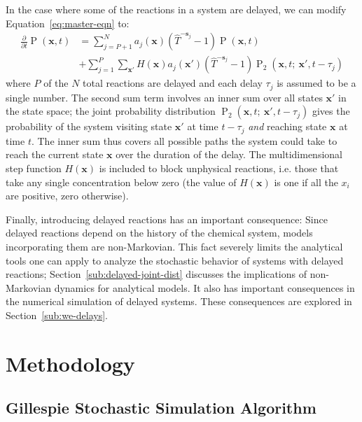 \documentclass[english,letterpaper,12pt]{report}
\renewcommand{\vec}[1]{\ensuremath{\mathbf{#1}}}
\DeclareMathOperator{\Prob}{P}
\newcommand{\delaytime}{\ensuremath{\tau}}
\begin{document}
\begin{doublespacing}
In the case where some of the reactions in a system are delayed, we can modify Equation~\eqref{eq:master-eqn} to:
\begin{align}
    \frac{\partial}{\partial t} \Prob(\vec{x}, t) &= \sum_{j=P+1}^N a_j(\vec{x})(\hat{T}^{-\vec{s}_j} - 1)\Prob(\vec{x}, t) \\
                                                  &+ \sum_{j=1}^P \sum_{\vec{x}'} H(\vec{x}) a_j(\vec{x}') (\hat{T}^{-\vec{s}_j} - 1) \Prob_2(\vec{x}, t;\: \vec{x}', t - \delaytime_j)
    \label{eq:master-eqn-delay}
\end{align}
where $P$ of the $N$ total reactions are delayed and each delay $\delaytime_j$ is assumed to be a single number. The second sum term involves an inner sum over all states $\vec{x}'$ in the state space; the joint probability distribution $\Prob_2(\vec{x}, t;\: \vec{x}', t - \delaytime_j)$ gives the probability of the system visiting state $\vec{x}'$ at time $t - \delaytime_j$ \emph{and} reaching state $\vec{x}$ at time $t$. The inner sum thus covers all possible paths the system could take to reach the current state $\vec{x}$ over the duration of the delay. The multidimensional step function $H(\vec{x})$ is included to block unphysical reactions, i.e. those that take any single concentration below zero (the value of $H(\vec{x})$ is one if all the $x_i$ are positive, zero otherwise). 

Finally, introducing delayed reactions has an important consequence: Since delayed reactions depend on the history of the chemical system, models incorporating them are non-Markovian. This fact severely limits the analytical tools one can apply to analyze the stochastic behavior of systems with delayed reactions; Section~\ref{sub:delayed-joint-dist} discusses the implications of non-Markovian dynamics for analytical models. It also has important consequences in the numerical simulation of delayed systems. These consequences are explored in Section~\ref{sub:we-delays}.



\chapter{Methodology} %
\label{sec:methodology}

\section{Gillespie Stochastic Simulation Algorithm} %
\label{sub:gillespie-ssa}


\end{doublespacing}
\end{document}
